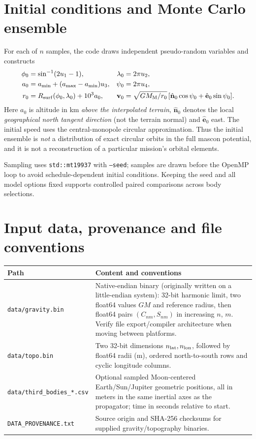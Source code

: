 \documentclass[11pt,a4paper]{article}
\newcommand{\opt}[1]{\texttt{#1}}
\newcommand{\pathcode}[1]{\nolinkurl{#1}}
\begin{document}
\section{Initial conditions and Monte Carlo ensemble}
For each of \(n\) samples, the code draws independent pseudo-random variables and constructs
\begin{align}
\phi_0&=\sin^{-1}(2u_1-1), & \lambda_0&=2\pi u_2,\\
a_0&=a_{\min}+(a_{\max}-a_{\min})u_3, &\psi_0&=2\pi u_4,\\
r_0&=R_{\rm surf}(\phi_0,\lambda_0)+10^3 a_0, &
\mathbf v_0&=\sqrt{GM_{\rm M}/r_0}\,[\hat{\mathbf n}_0\cos\psi_0+\hat{\mathbf e}_0\sin\psi_0].
\end{align}
Here \(a_0\) is altitude in km \emph{above the interpolated terrain}, \(\hat{\mathbf n}_0\) denotes the local \emph{geographical north tangent direction} (not the terrain normal) and \(\hat{\mathbf e}_0\) east. The initial speed uses the central-monopole circular approximation. Thus the initial ensemble is \emph{not} a distribution of exact circular orbits in the full mascon potential, and it is not a reconstruction of a particular mission's orbital elements.

Sampling uses \pathcode{std::mt19937} with \opt{--seed}; samples are drawn before the OpenMP loop to avoid schedule-dependent initial conditions. Keeping the seed and all model options fixed supports controlled paired comparisons across body selections.

\section{Input data, provenance and file conventions}
\begin{tabularx}{\linewidth}{@{}p{.23\linewidth}X@{}}
\toprule
Path & Content and conventions\\\midrule
\pathcode{data/gravity.bin} & Native-endian binary (originally written on a little-endian system): 32-bit harmonic limit, two float64 values \(GM\) and reference radius, then float64 pairs \((C_{nm},S_{nm})\) in increasing \(n\), \(m\). Verify file export/compiler architecture when moving between platforms.\\
\pathcode{data/topo.bin} & Two 32-bit dimensions \(n_{\rm lat},n_{\rm lon}\), followed by float64 radii (m), ordered north-to-south rows and cyclic longitude columns.\\
\pathcode{data/third_bodies_*.csv} & Optional sampled Moon-centered Earth/Sun/Jupiter geometric positions, all in meters in the same inertial axes as the propagator; time in seconds relative to start.\\
\pathcode{DATA_PROVENANCE.txt} & Source origin and SHA-256 checksums for supplied gravity/topography binaries.\\
\bottomrule
\end{tabularx}
\end{document}
